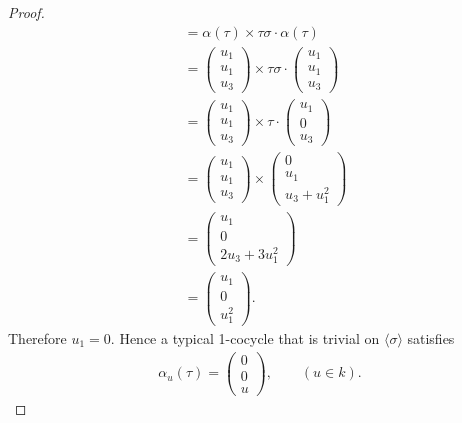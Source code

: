 \begin{proof}
\begin{align*}
		&= \alpha(\tau) \times \tau\sigma\cdot\alpha(\tau) \\
		&= \left(\begin{matrix} u_1 \\ u_1 \\ u_3\end{matrix} \right) \times
		\tau\sigma\cdot\left(\begin{matrix} u_1 \\ u_1 \\ u_3\end{matrix} \right)\\
		&= \left(\begin{matrix} u_1 \\ u_1 \\ u_3\end{matrix} \right) \times
		\tau\cdot\left(\begin{matrix} u_1 \\ 0 \\ u_3\end{matrix} \right)\\
		&= \left(\begin{matrix} u_1 \\ u_1 \\ u_3\end{matrix} \right) \times
		\left(\begin{matrix} 0 \\ u_1 \\ u_3 + u_1^2\end{matrix} \right)\\
		&= \left(\begin{matrix} u_1 \\ 0 \\ 2u_3 + 3u_1^2\end{matrix} \right)\\
		&= \left(\begin{matrix} u_1 \\ 0 \\ u_1^2\end{matrix} \right).
	\end{align*}
	Therefore $u_1 = 0$. Hence a typical 1-cocycle that is trivial on $\langle \sigma \rangle$ satisfies
	\begin{align*}
		\alpha_u(\tau) = \left(\begin{matrix} 0 \\ 0 \\ u \end{matrix} \right),\qquad (u\in k).
	\end{align*}

\end{proof}
